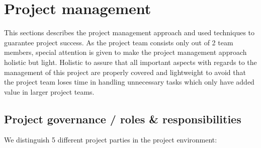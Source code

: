 \section{Project management}
\label{sec:project-management}
This sections describes the project management approach and used techniques to guarantee project success.
As the project team consists only out of 2 team members, special attention is given to make the project management approach holistic but light.
Holistic to assure that all important aspects with regards to the management of this project are properly covered and lightweight to avoid that the project team loses time in handling unnecessary tasks which only have added value in larger project teams.

\subsection{Project governance / roles \& responsibilities}
We distinguish 5 different project parties in the project environment:
